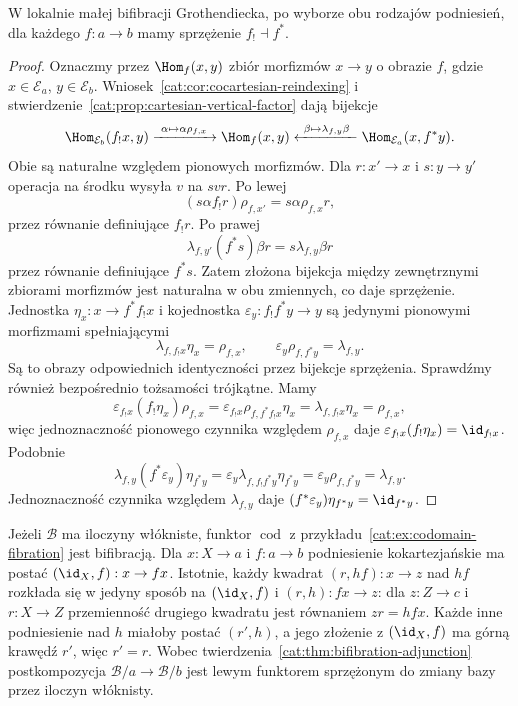 \begin{twierdzenie}\label{cat:thm:bifibration-adjunction}
W lokalnie małej bifibracji Grothendiecka, po wyborze obu rodzajów podniesień, dla każdego $f:a\to b$ mamy sprzężenie $f_!\dashv f^*$.
\end{twierdzenie}
\begin{proof}
Oznaczmy przez $\Hom_f(x,y)$ zbiór morfizmów $x\to y$ o obrazie $f$, gdzie $x\in\mathcal E_a$, $y\in\mathcal E_b$. Wniosek~\ref{cat:cor:cocartesian-reindexing} i stwierdzenie~\ref{cat:prop:cartesian-vertical-factor} dają bijekcje
\[
 \Hom_{\mathcal E_b}(f_!x,y)
 \xrightarrow{\ \alpha\mapsto\alpha\rho_{f,x}\ }\Hom_f(x,y)
 \xleftarrow{\ \beta\mapsto\lambda_{f,y}\beta\ }
 \Hom_{\mathcal E_a}(x,f^*y).
\]
Obie są naturalne względem pionowych morfizmów. Dla $r:x'\to x$ i $s:y\to y'$ operacja na środku wysyła $v$ na $svr$. Po lewej
\[
 (s\alpha f_!r)\rho_{f,x'}=s\alpha\rho_{f,x}r,
\]
przez równanie definiujące $f_!r$. Po prawej
\[
 \lambda_{f,y'}(f^*s)\beta r=s\lambda_{f,y}\beta r
\]
przez równanie definiujące $f^*s$. Zatem złożona bijekcja między zewnętrznymi zbiorami morfizmów jest naturalna w obu zmiennych, co daje sprzężenie. Jednostka $\eta_x:x\to f^*f_!x$ i kojednostka $\varepsilon_y:f_!f^*y\to y$ są jedynymi pionowymi morfizmami spełniającymi
\[
 \lambda_{f,f_!x}\eta_x=\rho_{f,x},\qquad
 \varepsilon_y\rho_{f,f^*y}=\lambda_{f,y}.
\]
Są to obrazy odpowiednich identyczności przez bijekcje sprzężenia. Sprawdźmy również bezpośrednio tożsamości trójkątne. Mamy
\[
 \varepsilon_{f_!x}(f_!\eta_x)\rho_{f,x}
 =\varepsilon_{f_!x}\rho_{f,f^*f_!x}\eta_x
 =\lambda_{f,f_!x}\eta_x=\rho_{f,x},
\]
więc jednoznaczność pionowego czynnika względem $\rho_{f,x}$ daje $\varepsilon_{f_!x}(f_!\eta_x)=\id_{f_!x}$. Podobnie
\[
 \lambda_{f,y}(f^*\varepsilon_y)\eta_{f^*y}
 =\varepsilon_y\lambda_{f,f_!f^*y}\eta_{f^*y}
 =\varepsilon_y\rho_{f,f^*y}
 =\lambda_{f,y}.
\]
Jednoznaczność czynnika względem $\lambda_{f,y}$ daje $(f^*\varepsilon_y)\eta_{f^*y}=\id_{f^*y}$.
\end{proof}

\begin{przyklad}\label{cat:ex:codomain-bifibration}
Jeżeli $\mathcal B$ ma iloczyny włókniste, funktor $\operatorname{cod}$ z przykładu~\ref{cat:ex:codomain-fibration} jest bifibracją. Dla $x:X\to a$ i $f:a\to b$ podniesienie kokartezjańskie ma postać $(\id_X,f):x\to fx$. Istotnie, każdy kwadrat $(r,hf):x\to z$ nad $hf$ rozkłada się w jedyny sposób na $(\id_X,f)$ i $(r,h):fx\to z$: dla $z:Z\to c$ i $r:X\to Z$ przemienność drugiego kwadratu jest równaniem $zr=hfx$. Każde inne podniesienie nad $h$ miałoby postać $(r',h)$, a jego złożenie z $(\id_X,f)$ ma górną krawędź $r'$, więc $r'=r$. Wobec twierdzenia~\ref{cat:thm:bifibration-adjunction} postkompozycja $\mathcal B/a\to\mathcal B/b$ jest lewym funktorem sprzężonym do zmiany bazy przez iloczyn włóknisty.
\end{przyklad}


